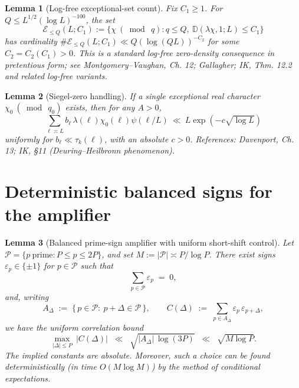\documentclass[11pt]{article}
\newtheorem{lemma}{Lemma}[part]
\theoremstyle{definition}
\theoremstyle{remark}
\numberwithin{equation}{part}
\begin{document}
\begin{lemma}[Log-free exceptional-set count]\label{lem:logfree-density}
	Fix $C_1\ge 1$. For $Q\le L^{1/2}(\log L)^{-100}$, the set
	\[
		\mathcal E_{\le Q}(L;C_1):=\{\chi\ (\bmod\ q): q\le Q,\ \mathbb D(\lambda\chi,1;L)\le C_1\}
	\]
	has cardinality $\#\mathcal E_{\le Q}(L;C_1)\ll Q(\log (QL))^{-C_2}$ for some $C_2=C_2(C_1)>0$. This is a standard log-free zero-density consequence in pretentious form; see Montgomery--Vaughan, Ch. 12; Gallagher; IK, Thm. 12.2 and related log-free variants.
\end{lemma}

\begin{lemma}[Siegel-zero handling]\label{lem:siegel}
	If a single exceptional real character $\chi_0\ (\bmod\ q_0)$ exists, then for any $A>0$,
	\[
		\sum_{\ell\asymp L} b_\ell\,\lambda(\ell)\chi_0(\ell)\psi(\ell/L)\ \ll\ L\exp(-c\sqrt{\log L})
	\]
	uniformly for $b_\ell\ll \tau_k(\ell)$, with an absolute $c>0$. References: Davenport, Ch. 13; IK, §11 (Deuring--Heilbronn phenomenon).
\end{lemma}

\section{Deterministic balanced signs for the amplifier}


\begin{lemma}[Balanced prime-sign amplifier with uniform short-shift control]\label{lem:balanced-signs}
	Let $\mathcal P=\{p\ \text{prime}: P\le p\le 2P\}$, and set $M:=|\mathcal P|\asymp P/\log P$.
	There exist signs $\varepsilon_p\in\{\pm 1\}$ for $p\in\mathcal P$ such that
	\begin{equation}\label{eq:balanced-sum-zero}
		\sum_{p\in\mathcal P}\varepsilon_p \;=\; 0,
	\end{equation}
	and, writing
	\[
		A_\Delta \;:=\; \{\,p\in\mathcal P:\ p+\Delta\in\mathcal P\,\},
		\qquad
		C(\Delta)\;:=\;\sum_{p\in A_\Delta}\varepsilon_p\,\varepsilon_{p+\Delta},
	\]
	we have the uniform correlation bound
	\begin{equation}\label{eq:balanced-correlation}
		\max_{|\Delta|\le P}\ |C(\Delta)|
		\;\;\ll\;\; \sqrt{|A_\Delta|\,\log(3P)}
		\;\;\ll\;\; \sqrt{M\log P}.
	\end{equation}
	The implied constants are absolute. Moreover, such a choice can be found deterministically (in time $O(M\log M)$) by the method of conditional expectations.
\end{lemma}
\end{document}
